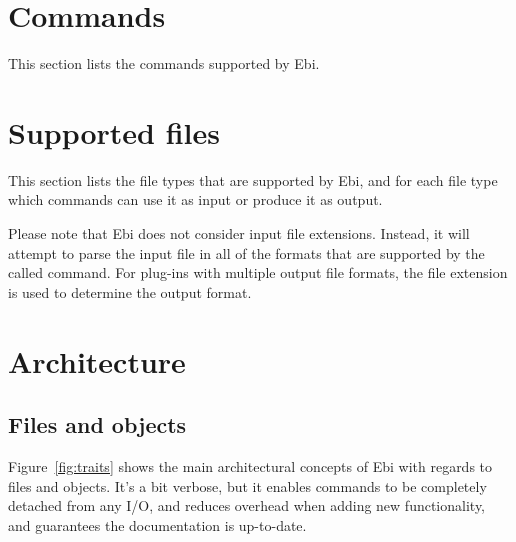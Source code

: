 \documentclass{article}
\begin{document}
\section{Commands}
\label{sec:commands}

	This section lists the commands supported by Ebi.

    \ebicommands

\clearpage
\section{Supported files}
\label{sec:filehandlers}
	This section lists the file types that are supported by Ebi, and for each file type which commands can use it as input or produce it as output.
	
    Please note that Ebi does not consider input file extensions.
    Instead, it will attempt to parse the input file in all of the formats that are supported by the called command.
    For plug-ins with multiple output file formats, the file extension is used to determine the output format.
    
    \ebifilehandlers

\clearpage
\section{Architecture}
\label{sec:architecture}

    \subsection{Files and objects}
        Figure~\ref{fig:traits} shows the main architectural concepts of Ebi with regards to files and objects.
        It's a bit verbose, but it enables commands to be completely detached from any I/O, and reduces overhead when adding new functionality, and guarantees the documentation is up-to-date.
    
\end{document}
